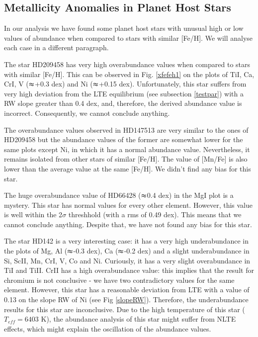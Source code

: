 \documentclass[dvips,12pt,a4paper]{report}
\begin{document}
{{\subsection{Metallicity Anomalies in Planet Host Stars}
\label {anomaly}
In our analysis we have found some planet host stars with unusual high or low values of abundance when compared to stars with similar [Fe/H]. We will analyse each case in a different paragraph. 

The star HD209458 has very high overabundance values when compared to stars with similar [Fe/H]. This can be observed in Fig. \ref{xfefeh1} on the plots of TiI, Ca, CrI, V ($\thickapprox$+0.3 dex) and Ni ($\thickapprox$+0.15 dex). Unfortunately, this star suffers from very high deviation from the LTE equilibrium (see subsection \ref{testpar}) with a RW slope greater than 0.4 dex, and, therefore, the derived abundance value is incorrect. Consequently, we cannot conclude anything.  %

The overabundance values observed in HD147513 are very similar to the ones of HD209458 but the abundance values of the former are somewhat lower for the same plots except Ni, in which it has a normal abundance value. Nevertheless, it remains isolated from other stars of similar [Fe/H]. The value of [Mn/Fe] is also lower than the average value at the same [Fe/H]. We didn't find any bias for this star.

The huge overabundance value of HD66428 ($\thickapprox$0.4 dex) in the MgI plot is a mystery. This star has normal values for every other element. However, this value is well within the 2$\sigma$ threshhold (with a rms of 0.49 dex). This means that we cannot conclude anything. Despite that, we have not found any bias for this star.

The star HD142 is a very interesting case: it has a very high underabundance in the plots of Mg, Al ($\thickapprox$-0.3 dex), Ca ($\thickapprox$-0.2 dex) and a slight underabundance in Si, ScII, Mn, CrI, V, Co and Ni. Curiously, it has a very slight overabundance in TiI and TiII. CrII has a high overabundance value: this implies that the result for chromium is not conclusive - we have two contradictory values for the same element. However, this star has a reasonable deviation from LTE with a value of 0.13 on the slope RW of Ni (see Fig \ref{slopeRW}). Therefore, the underabundance results for this star are inconclusive. Due to the high temperature of this star ($T_{eff}=6403$ K), the abundance analysis of this star might suffer from NLTE effects, which might explain the oscillation of the abundance values.

}}
\end{document}
